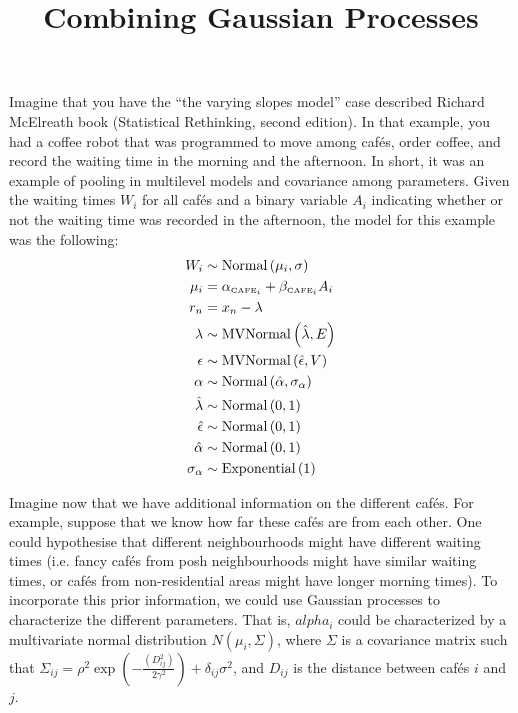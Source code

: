 \documentclass[11pt, a4paper]{article}
\title{\vspace{-1cm}
Combining Gaussian Processes}
\date{}
\begin{document}
\maketitle
\linenumbers
Imagine that you have the ``the varying slopes model'' case described Richard McElreath book (Statistical Rethinking, second edition). In that example, you had a coffee robot that was programmed to move among cafés, order coffee, and record the waiting time in the morning and the afternoon. In short, it was an example of pooling in multilevel models and covariance among parameters. Given the waiting times $W_i$ for all cafés and a binary variable $A_i$ indicating whether or not the waiting time was recorded in the afternoon, the model for this example was the following:
\begin{equation*} 
\begin{split}
W_i & \sim \text{Normal}\left(\mu_{i}, \sigma\right)\\
\mu_{i} & = \alpha_{\text{\tiny CAFE}_i} + \beta_{\text{\tiny CAFE}_i} A_i\\
r_n & = x_n-\lambda\\
\lambda  & \sim \text{MVNormal}\left(\hat{\lambda}, E\right)\\
\epsilon  & \sim \text{MVNormal}\left(\hat{\epsilon}, V\right)\\
\alpha  & \sim \text{Normal}\left(\hat{\alpha}, \sigma_{\alpha}\right)\\
\hat{\lambda}  & \sim \text{Normal}\left(0,1\right)\\
\hat{\epsilon}  & \sim \text{Normal}\left(0,1\right)\\
\hat{\alpha}  & \sim \text{Normal}\left(0,1\right)\\
\sigma_{\alpha}  & \sim \text{Exponential}\left(1\right)
\end{split}
\end{equation*}

Imagine now that we have additional information on the different cafés. For example, suppose that we know how far these cafés are from each other. One could hypothesise that different neighbourhoods might have different waiting times (i.e. fancy cafés from posh neighbourhoods might have similar waiting times, or cafés from non-residential areas might have longer morning times). To incorporate this prior information, we could use Gaussian processes to characterize the different parameters. That is, $alpha_i$ could be characterized by a multivariate normal distribution $N(\mu_i, \Sigma)$, where $\Sigma$ is a covariance matrix such that $\Sigma_{ij} = \rho^2 \exp(-\frac{(D_{ij}^{2})}{2\gamma^2}) + \delta_{ij} \sigma^{2}$, and $D_{ij}$ is the distance between cafés $i$ and $j$.
\end{document}

